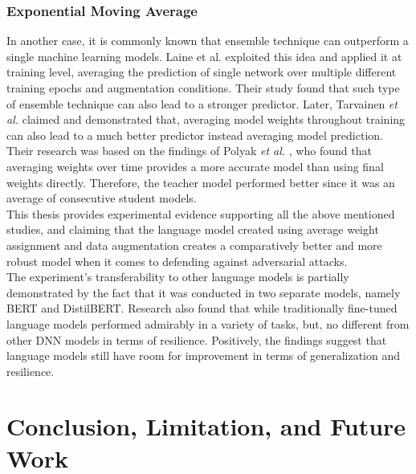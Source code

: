 \documentclass[%
	BCOR=8mm, %
	DIV=12,
	toc=bibliography, %
	toc=listof, %
	oneside, %
	egregdoesnotlikesansseriftitles, %
	]{scrbook}
\begin{document}
\subsection{Exponential Moving Average}
In another case, it is commonly known that ensemble technique can outperform a single machine learning models. Laine et al. \cite{laine_temporal_2017} exploited this idea and applied it at training level, averaging the prediction of single network over multiple different training epochs and augmentation conditions. Their study found that such type of ensemble technique can also lead to a stronger predictor. Later,  Tarvainen \textit{et al.} \cite{tarvainen_mean_2018} claimed and demonstrated that, averaging model weights throughout training can also lead to a much better predictor instead averaging model prediction. \\
Their research was based on the findings of Polyak \textit{et al.} \cite{polyak_acceleration_1992}, who found that averaging weights over time provides a more accurate model than using final weights directly. Therefore, the teacher model performed better since it was an average of consecutive student models. \\
This thesis provides experimental evidence supporting all the above mentioned studies, and claiming that the language model created using average weight assignment and data augmentation creates a comparatively better and more robust model when it comes to defending against adversarial attacks.\\
The experiment's transferability to other language models is partially demonstrated by the fact that it was conducted in two separate models, namely BERT and DistilBERT. Research also found that while traditionally fine-tuned language models performed admirably in a variety of tasks, but, no different from other DNN models in terms of resilience. Positively, the findings suggest that language models still have room for improvement in terms of generalization and resilience.
\chapter{Conclusion, Limitation, and Future Work}
\label{chapter:conclusion}
\end{document}
